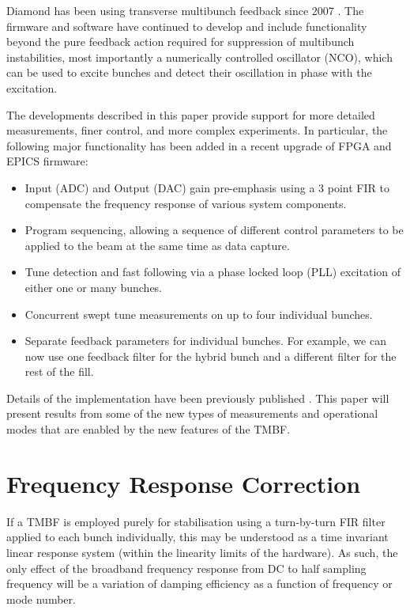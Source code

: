 \documentclass[a4paper]{jacow}
\begin{document}
Diamond has been using transverse multibunch feedback since 2007
\cite{performance}.  The firmware and software have continued to develop and include
functionality beyond the pure feedback action required for suppression of
multibunch instabilities, most importantly a numerically controlled oscillator (NCO), which can be used to excite bunches and detect their oscillation in phase with the excitation.

The developments described in this paper
provide support for more detailed measurements, finer control, and more complex
experiments.  In particular, the following major functionality has been added in a recent upgrade of FPGA and EPICS firmware:

\begin{itemize}
\item
    Input (ADC) and Output (DAC) gain pre-emphasis using a 3 point FIR to compensate the frequency response of various system components.
\item
    Program sequencing, allowing a sequence of different control parameters to
be applied to the beam at the same time as data capture.
\item
    Tune detection and fast following via a phase locked loop (PLL) excitation of either one or many bunches.
\item
    Concurrent swept tune measurements on up to four individual bunches.
\item
    Separate feedback parameters for individual bunches.  For example, we can
now use one feedback filter for the hybrid bunch and a different filter for the
rest of the fill.
\end{itemize}

Details of the implementation have been previously published \cite{capabilities, capabilities2}. This paper will present results from some of the new types of measurements and operational modes that are enabled by the new features of the TMBF.

\section{Frequency Response Correction}

If a TMBF is employed purely for stabilisation using a turn-by-turn FIR filter applied to each bunch individually, this may be understood as a time invariant linear response system (within the linearity limits of the hardware). As such, the only effect of the broadband frequency response from DC to half sampling frequency will be a variation of damping efficiency as a function of frequency or mode number.
\end{document}
